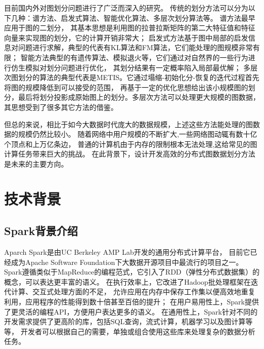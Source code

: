\documentclass[master]{njuthesis}
\begin{document}
目前国内外对图划分问题进行了广泛而深入的研究。
传统的划分方法可以分为以下几种：谱方法、启发式算法、智能优化算法、多层次划分算法等。
谱方法\cite{DBLP:journals/siamsc/HendricksonL95}最早应用于图的二划分，
其基本思想是利用图的拉普拉斯矩阵的第二大特征值和特征向量来实现图的划分，它的计算开销非常大；
启发式方法基于图中局部的启发信息对问题进行求解，典型的代表有KL\cite{kernighan1970efficient}算法和FM\cite{fiduccia1988linear}算法，它们能处理的图规模非常有限；
智能方法典型的有遗传算法\cite{bui1996genetic}、模拟退火\cite{johnson1989optimization}等，它们通过对自然界的一些行为进行仿生模拟对划分问题进行优化，
其划分结果有一定概率陷入局部最优解；
多层次图划分的算法的典型代表是METIS\cite{Karypis95metis}。它通过塌缩-初始化分-恢复的迭代过程首先将图的规模降低到可以接受的范围，
再基于一定的优化思想给出该小规模图的划分，最后将划分投影成原始图上的划分。多层次方法可以处理更大规模的图数据，
其思想受到了很多其它方法的借鉴。

但总的来说，相比于如今大数据时代庞大的数据规模，上述这些方法能处理的图数据的规模仍然比较小。
随着网络中用户规模的不断扩大,一些网络图动辄有数十亿个顶点和上万亿条边，
普通的计算机由于内存的限制根本无法处理,这给常见的图计算任务带来巨大的挑战。
在此背景下，设计开发高效的分布式图数据划分方法是未来的主要方向。

\section{技术背景}
\subsection{Spark背景介绍}
Aparch Spark\cite{DBLP:conf/hotcloud/ZahariaCFSS10}是由UC Berkeley AMP Lab开发的通用分布式计算平台，
目前它已经成为Apache Software Foundation下大数据开源项目中最流行的项目之一。
Spark遵循类似于MapReduce的编程范式，它引入了RDD（弹性分布式数据集）的概念，可以表达更丰富的语义。
在执行效率上，它改进了Hadoop\cite{DBLP:conf/osdi/DeanG04}批处理框架在迭代计算、交互式处理方面的不足，
允许应用在内存中保存工作集以便高效地重复利用，应用程序的性能得到数十倍甚至百倍的提升；
在用户易用性上，Spark提供了更灵活的编程API，方便用户表达更多的语义。
在通用性上，Spark针对不同的开发需求提供了更高阶的库，包括SQL查询，流式计算，机器学习以及图计算等等，
开发者可以根据自己的需要，单独或组合使用这些库来处理复杂的数据分析任务。
\end{document}
